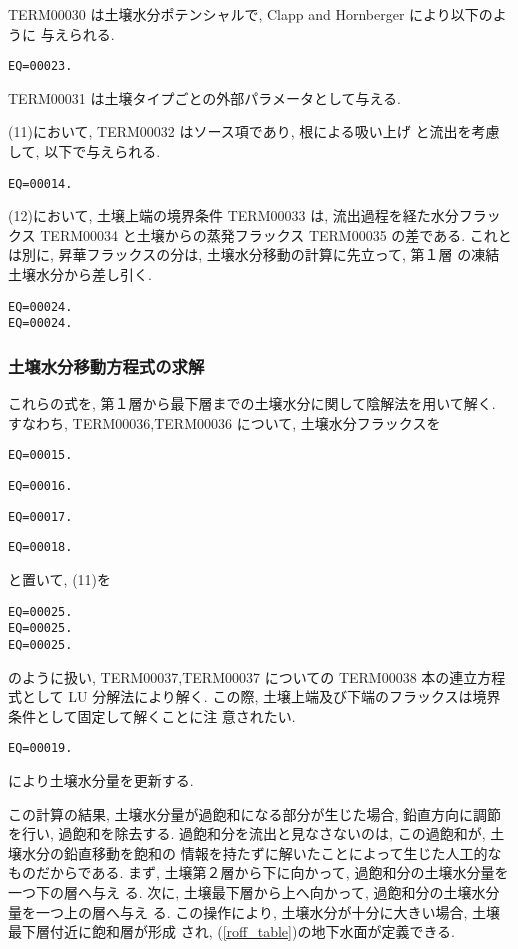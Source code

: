 TERM00030 は土壌水分ポテンシャルで, Clapp and Hornberger により以下のように
与えられる.
\begin{verbatim}
EQ=00023.
\end{verbatim}
TERM00031 は土壌タイプごとの外部パラメータとして与える.

(11)において, TERM00032 はソース項であり, 根による吸い上げ
と流出を考慮して, 以下で与えられる.
\begin{verbatim}
EQ=00014.
\end{verbatim}

(12)において,
土壌上端の境界条件 TERM00033 は, 流出過程を経た水分フラックス
TERM00034 と土壌からの蒸発フラックス TERM00035 の差である.
これとは別に, 昇華フラックスの分は, 土壌水分移動の計算に先立って, 第１層
の凍結土壌水分から差し引く.
\begin{verbatim}
EQ=00024.
EQ=00024.
\end{verbatim}

\subsubsection{土壌水分移動方程式の求解}

これらの式を, 第１層から最下層までの土壌水分に関して陰解法を用いて解く.
すなわち, TERM00036,TERM00036 について, 土壌水分フラックスを
\begin{verbatim}
EQ=00015.
\end{verbatim}
\begin{verbatim}
EQ=00016.
\end{verbatim}
\begin{verbatim}
EQ=00017.
\end{verbatim}
\begin{verbatim}
EQ=00018.
\end{verbatim}
と置いて, (11)を
\begin{verbatim}
EQ=00025.
EQ=00025.
EQ=00025.
\end{verbatim}
のように扱い, TERM00037,TERM00037 についての
TERM00038 本の連立方程式として LU 分解法により解く.
この際, 土壌上端及び下端のフラックスは境界条件として固定して解くことに注
意されたい.
\begin{verbatim}
EQ=00019.
\end{verbatim}
により土壌水分量を更新する.

この計算の結果, 土壌水分量が過飽和になる部分が生じた場合, 鉛直方向に調節
を行い, 過飽和を除去する.
過飽和分を流出と見なさないのは, この過飽和が, 土壌水分の鉛直移動を飽和の
情報を持たずに解いたことによって生じた人工的なものだからである.
まず, 土壌第２層から下に向かって, 過飽和分の土壌水分量を一つ下の層へ与え
る.
次に, 土壌最下層から上へ向かって, 過飽和分の土壌水分量を一つ上の層へ与え
る.
この操作により, 土壌水分が十分に大きい場合, 土壌最下層付近に飽和層が形成
され, (\ref{roff_table})の地下水面が定義できる.

